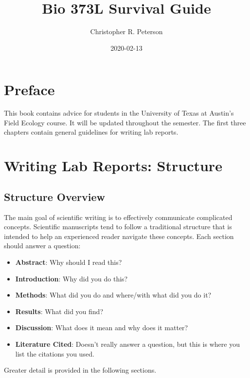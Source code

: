 \documentclass[]{book}
\title{Bio 373L Survival Guide}
\author{Christopher R. Peterson}
\date{2020-02-13}
\providecommand{\tightlist}{%
  \setlength{\itemsep}{0pt}\setlength{\parskip}{0pt}}
\begin{document}
\maketitle

{
\setcounter{tocdepth}{1}
\tableofcontents
}
\chapter*{Preface}\label{preface}

This book contains advice for students in the University of Texas at
Austin's Field Ecology course. It will be updated throughout the
semester. The first three chapters contain general guidelines for
writing lab reports.

\chapter{Writing Lab Reports: Structure}\label{structure}

\section{Structure Overview}\label{structure-overview}

The main goal of scientific writing is to effectively communicate
complicated concepts. Scientific manuscripts tend to follow a
traditional structure that is intended to help an experienced reader
navigate these concepts. Each section should answer a question:

\begin{itemize}
\tightlist
\item
  \textbf{Abstract}: Why should I read this?
\item
  \textbf{Introduction}: Why did you do this?\\
\item
  \textbf{Methods}: What did you do and where/with what did you do it?
\item
  \textbf{Results}: What did you find?\\
\item
  \textbf{Discussion}: What does it mean and why does it matter?
\item
  \textbf{Literature Cited}: Doesn't really answer a question, but this
  is where you list the citations you used.
\end{itemize}

Greater detail is provided in the following sections.
\end{document}

